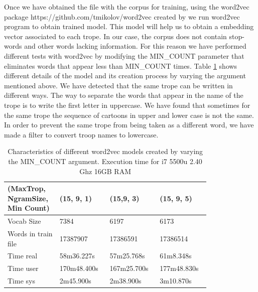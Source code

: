 \documentclass[letterpaper]{article}
\begin{document}
	   Once we have obtained the file with the corpus for training, using the word2vec package https://github.com/tmikolov/word2vec created by
	   \cite{mikolov2013} we run word2vec program to obtain trained model. This model will help us to obtain a embedding vector associated to each trope.
	   In our case, the corpus does not contain stop-words and other words lacking information. For this reason we have performed different tests with
	   word2vec by modifying the MIN\_COUNT parameter that eliminates words that appear less than MIN\_COUNT times. Table \ref{tab:variations-with-min-count-argument-15-9}
	   shows different details of the model and its creation process by varying the argument mentioned above.
	   We have detected that the same trope can be written in different ways. The way to separate the words that appear in the name of the trope is to write
	    the first letter in uppercase. We have found that sometimes for the same trope the sequence of cartoons in upper and lower case is not the same. 
	   In order to prevent the same trope from being taken as a different word, we have made a filter to convert troop names to lowercase.
	   
	   
	\begin{table}[t]
		\centering
		\begin{tabular}{|p{0.20\linewidth}|p{0.2\linewidth}|p{0.2\linewidth}|p{0.2\linewidth}|}
			\hline
			\textbf{(MaxTrop, NgramSize, Min Count)}& \textbf{(15, 9, 1)} & \textbf{(15,9, 3)} & \textbf{(15, 9, 5)}\\
			\hline
			\hline
			Vocab Size& 7384 & 6197 & 6173 \\
			\hline
			Words in train file& 17387907 & 17386591 & 17386514 \\
			\hline
			Time real&58m36.227s&57m25.768s&61m8.348s\\
			\hline
			Time user&170m48.400s&167m25.700s&177m48.830s\\
			\hline
			Time sys&2m45.900s&2m38.900s&3m10.870s\\
			\hline
			
		\end{tabular}
		\caption{Characteristics of different word2vec models created by varying the MIN\_COUNT argument. Execution time for i7 5500u 2.40 Ghz 16GB RAM}
		\label{tab:variations-with-min-count-argument-15-9}
	\end{table}	
	
\end{document}
